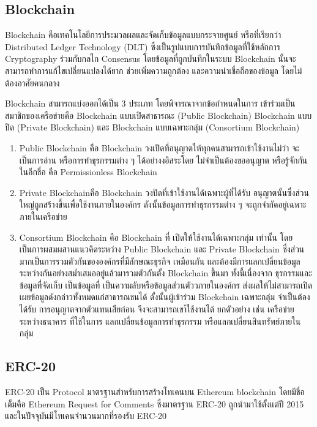 \documentclass[12pt,oneside,openright,a4paper]{cpe-thai-project}
\begin{document}
\subsection{Blockchain}
\tab Blockchain คือเทคโนโลยีการประมวลผลและจัดเก็บข้อมูลแบบกระจายศูนย์ หรือที่เรียกว่า Distributed Ledger Technology (DLT) ซึ่งเป็นรูปแบบการบันทึกข้อมูลที่ใช้หลักการ Cryptography ร่วมกับกลไก Consensus โดยข้อมูลที่ถูกบันทึกในระบบ Blockchain นั้นจะสามารถทำการแก้ไขเปลี่ยนแปลงได้ยาก ช่วยเพิ่มความถูกต้อง และความน่าเชื่อถือของข้อมูล โดยไม่ต้องอาศัยคนกลาง

\tab Blockchain สามารถแบ่งออกได้เป็น 3 ประเภท โดยพิจารณาจากข้อกำหนดในการ เข้าร่วมเป็นสมาชิกของเครือข่ายคือ Blockchain แบบเปิดสาธารณะ (Public Blockchain) Blockchain แบบปิด (Private Blockchain) และ Blockchain แบบเฉพาะกลุ่ม (Consortium Blockchain) 
\begin{enumerate}[label=\thesubsection.\arabic*,leftmargin=0pt,itemindent=2cm]
\item Public Blockchain คือ Blockchain วงเปิดที่อนุญาตให้ทุกคนสามารถเข้าใช้งานไม่ว่า จะเป็นการอ่าน หรือการทำธุรกรรมต่าง ๆ ได้อย่างงอิสระโดย ไม่จำเป็นต้องขออนุญาต หรือรู้จักกันในอีกชื่อ คือ Permissionless Blockchain
\item Private Blockchainคือ Blockchain วงปิดที่เข้าใช้งานได้เฉพาะผู้ที่ได้รับ อนุญาตนั้นซึ่งส่วนใหญ่ถูกสร้างขึ้นเพื่อใช้งานภายในองค์กร ดังนั้นข้อมูลการทำธุรกรรมต่าง ๆ จะถูกจํากัดอยู่เฉพาะภายในเครือข่าย
\item Consortium Blockchain คือ Blockchain ที่ เปิดให้ใช้งานได้เฉพาะกลุ่ม เท่านั้น โดยเป็นการผสมผสานแนวคิดระหว่าง Public Blockchain และ Private Blockchain ซึ่งส่วนมากเป็นการรวมตัวกันขององค์กรที่มีลักษณะธุรกิจ เหมือนกัน และต้องมีการแลกเปลี่ยนข้อมูลระหว่างกันอย่างสม่ำเสมออยู่แล้วมารวมตัวกันตั้ง Blockchain ขึ้นมา ทั้งนี้เนื่องจาก ธุรกรรมและข้อมูลที่จัดเก็บ เป็นข้อมูลที่ เป็นความลับหรือข้อมูลส่วนตัววภายในองค์กร ส่งผลให้ไม่สามารถเปิดเผยข้อมูลดังกล่าวทั้งหมดแก่สาธารณชนได้ ดั้งนั้นผู้เข้าร่วม Blockchain เฉพาะกลุ่ม จำเป็นต้องได้รับ การอนุญาตจากตัวแทนเสียก่อน จึงจะสามารถเขา้ใช้งานได้ ยกตัวอย่าง เช่น เครือข่ายระหว่างธนาคาร ที่ใช้ในการ แลกเปลี่ยนข้อมูลการทำธุรกรรม หรือแลกเปลี่ยนสินทรัพย์ภายในกลุ่ม
\end{enumerate}
\subsection{ERC-20}
\tab ERC-20 เป็น Protocol มาตรฐานสําหรับการสร้างโทเคนบน Ethereum blockchain โดยมีชื่อเต็มคือ Ethereum Request for Comments ซึ่งมาตรฐาน ERC-20 ถูกนํามาใช้ตั้งแต่ปี 2015 และในปัจจุบันมีโทเคนจํานวนมากที่รองรับ ERC-20
\end{document}
